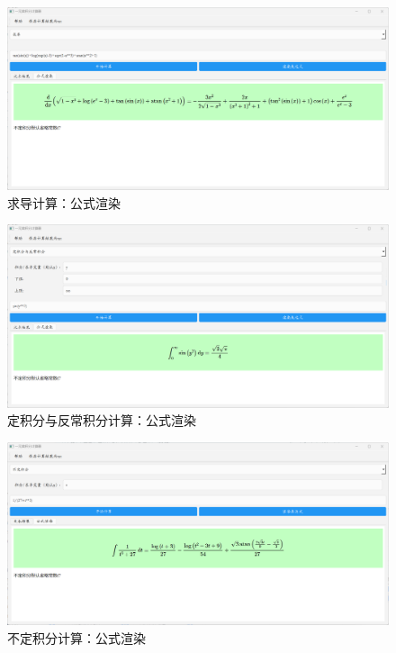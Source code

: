 \documentclass[UTF8,12pt]{ctexart}
\begin{document}
	\begin{figure}[H]
		\centering
		\includegraphics[width=1.0\linewidth]{求导计算_公式渲染}
		\caption{求导计算：公式渲染}
		\label{fig:dif_latex}
	\end{figure}
	\begin{figure}[H]
		\centering
		\includegraphics[width=1.0\linewidth]{定积分与反常积分计算_公式渲染}
		\caption{定积分与反常积分计算：公式渲染}
		\label{fig:deintegral}
	\end{figure}
	\begin{figure}[H]
		\centering
		\includegraphics[width=1.0\linewidth]{不定积分计算_公式渲染}
		\caption{不定积分计算：公式渲染}
		\label{fig:integral}
	\end{figure}
\end{document}
